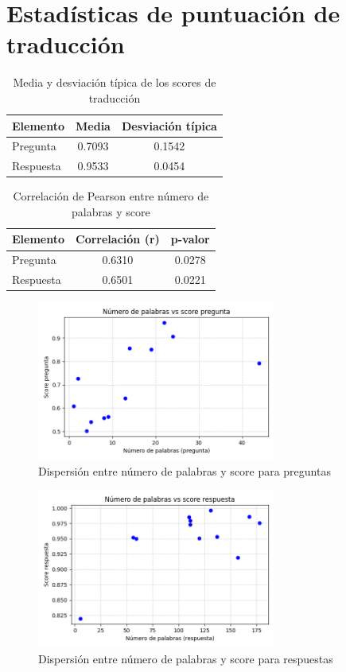 \documentclass{article}
\begin{document}
\section*{Estadísticas de puntuación de traducción}

\begin{table}[H]
\centering
\caption{Media y desviación típica de los scores de traducción}
\begin{tabular}{lcc}
\toprule
\textbf{Elemento} & \textbf{Media} & \textbf{Desviación típica} \\
\midrule
Pregunta & 0.7093 & 0.1542 \\
Respuesta & 0.9533 & 0.0454 \\
\bottomrule
\end{tabular}
\end{table}

\bigskip

\begin{table}[H]
\centering
\caption{Correlación de Pearson entre número de palabras y score}
\begin{tabular}{lcc}
\toprule
\textbf{Elemento} & \textbf{Correlación (r)} & \textbf{p-valor} \\
\midrule
Pregunta & 0.6310 & 0.0278 \\
Respuesta & 0.6501 & 0.0221 \\
\bottomrule
\end{tabular}
\end{table}

\bigskip

\begin{figure}[H]
\centering
\includegraphics[width=0.7\textwidth]{../graficos/scatter_pregunta.png}
\caption{Dispersión entre número de palabras y score para preguntas}
\end{figure}

\begin{figure}[H]
\centering
\includegraphics[width=0.7\textwidth]{../graficos/scatter_respuesta.png}
\caption{Dispersión entre número de palabras y score para respuestas}
\end{figure}
\end{document}
